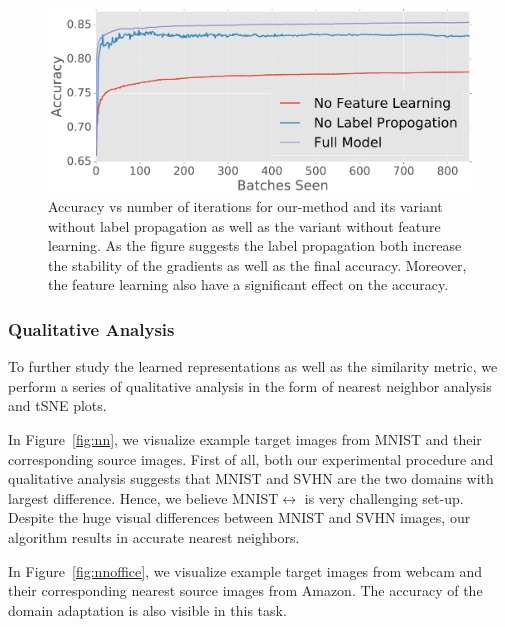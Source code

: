 \begin{figure}[ht]
\vspace{-1mm}
\includegraphics[width=\columnwidth]{no_feature_propogation}
\vspace{-6mm}
\caption{Accuracy vs number of iterations for our-method and its variant without label propagation as well as the variant without feature learning. As the figure suggests the label propagation both increase the stability of the gradients as well as the final accuracy. Moreover, the feature learning also have a significant effect on the accuracy.}
\label{fllprop}
\end{figure}

\vspace{-2mm}
\subsubsection{Qualitative Analysis}
To further study the learned representations as well as the similarity metric, we perform a series of qualitative analysis in the form of nearest neighbor analysis and tSNE\cite{tsne} plots.

In Figure~\ref{fig:nn}, we visualize example target images from MNIST and their corresponding source images. First of all, both our experimental procedure and qualitative analysis suggests that MNIST and SVHN are the two domains with largest difference. Hence, we believe MNIST$\leftrightarrow$ is very challenging set-up. Despite the huge visual differences between MNIST and SVHN images, our algorithm results in accurate nearest neighbors.

In Figure~\ref{fig:nnoffice},  we visualize example target images from webcam and their corresponding nearest source images from Amazon. The accuracy of the domain adaptation is also visible in this task. 

